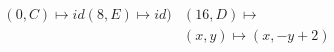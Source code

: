 \documentclass[preview]{standalone}
\begin{document}
\begin{align*}
(0,C) \mapsto id (8,E) \mapsto id) &(16,D) \mapsto \\& (x,y) \mapsto (x, -y + 2)
\end{align*}
\end{document}
